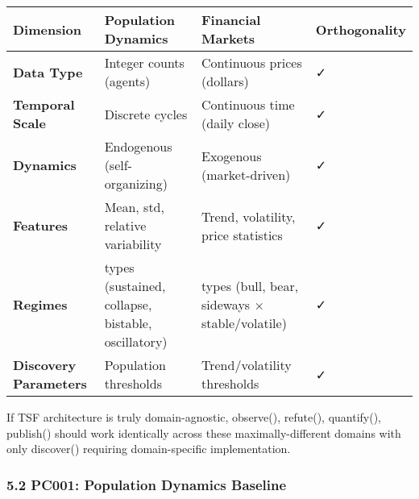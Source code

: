 \documentclass[
]{article}
\newcounter{none} %
\begin{document}
{\def\LTcaptype{none} %
\begin{longtable}[]{@{}
  >{\raggedright\arraybackslash}p{}
  >{\raggedright\arraybackslash}p{}
  >{\raggedright\arraybackslash}p{}
  >{\raggedright\arraybackslash}p{}@{}}
\toprule\noalign{}
\begin{minipage}[b]{\linewidth}\raggedright
Dimension
\end{minipage} & \begin{minipage}[b]{\linewidth}\raggedright
Population Dynamics
\end{minipage} & \begin{minipage}[b]{\linewidth}\raggedright
Financial Markets
\end{minipage} & \begin{minipage}[b]{\linewidth}\raggedright
Orthogonality
\end{minipage} \\
\midrule\noalign{}
\endhead
\bottomrule\noalign{}
\endlastfoot
\textbf{Data Type} & Integer counts (agents) & Continuous prices
(dollars) & ✓ \\
\textbf{Temporal Scale} & Discrete cycles & Continuous time (daily
close) & ✓ \\
\textbf{Dynamics} & Endogenous (self-organizing) & Exogenous
(market-driven) & ✓ \\
\textbf{Features} & Mean, std, relative variability & Trend, volatility,
price statistics & ✓ \\
\textbf{Regimes} & 5 types (sustained, collapse, bistable, oscillatory)
& 6 types (bull, bear, sideways × stable/volatile) & ✓ \\
\textbf{Discovery Parameters} & Population thresholds & Trend/volatility
thresholds & ✓ \\
\end{longtable}
}

If TSF architecture is truly domain-agnostic, observe(), refute(),
quantify(), publish() should work identically across these
maximally-different domains with only discover() requiring
domain-specific implementation.

\subsubsection{5.2 PC001: Population Dynamics
Baseline}\label{pc001-population-dynamics-baseline}
\end{document}

